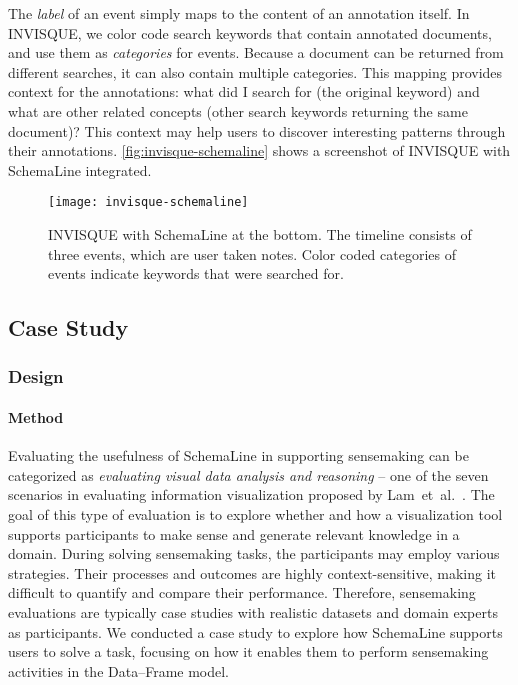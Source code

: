 The \emph{label} of an event simply maps to the content of an annotation itself. In INVISQUE, we color code search keywords that contain annotated documents, and use them as \emph{categories} for events. Because a document can be returned from different searches, it can also contain multiple categories. This mapping provides context for the annotations: what did I search for (the original keyword) and what are other related concepts (other search keywords returning the same document)? This context may help users to discover interesting patterns through their annotations. \autoref{fig:invisque-schemaline} shows a screenshot of INVISQUE with SchemaLine integrated.

\begin{figure}[!htb]
	\centering
	\texttt{[image: invisque-schemaline]}
	\caption{INVISQUE with SchemaLine at the bottom. The timeline consists of three events, which are user taken notes. Color coded categories of events indicate keywords that were searched for.}
	\label{fig:invisque-schemaline}
\end{figure}

\subsection{Case Study}

\subsubsection{Design}

\paragraph{Method}
Evaluating the usefulness of SchemaLine in supporting sensemaking can be categorized as \emph{evaluating visual data analysis and reasoning} -- one of the seven scenarios in evaluating information visualization proposed by Lam~et~al.~\cite{Lam2012}. The goal of this type of evaluation is to explore whether and how a visualization tool supports participants to make sense and generate relevant knowledge in a domain. During solving sensemaking tasks, the participants may employ various strategies. Their processes and outcomes are highly context-sensitive, making it difficult to quantify and compare their performance. Therefore, sensemaking evaluations are typically case studies with realistic datasets and domain experts as participants. We conducted a case study to explore how SchemaLine supports users to solve a task, focusing on how it enables them to perform sensemaking activities in the Data--Frame model.

